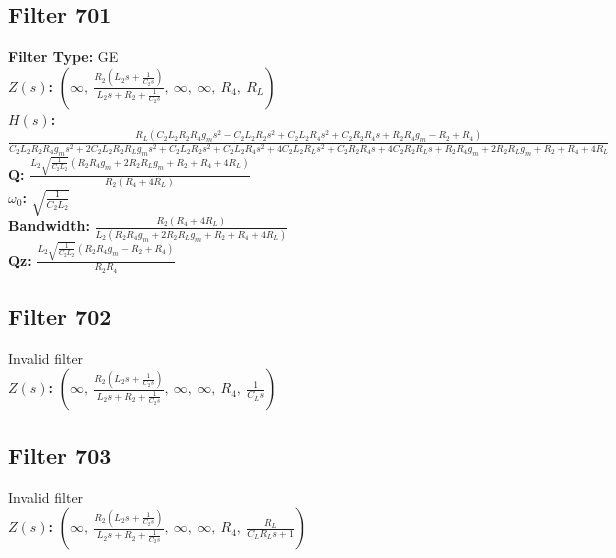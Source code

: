 \documentclass{article}
\begin{document}
\subsection*{Filter 701}
\textbf{Filter Type:} GE \\ 
\textbf{$Z(s)$:} $\left( \infty, \  \frac{R_{2} \left(L_{2} s + \frac{1}{C_{2} s}\right)}{L_{2} s + R_{2} + \frac{1}{C_{2} s}}, \  \infty, \  \infty, \  R_{4}, \  R_{L}\right)$ \\ 
\textbf{$H(s)$:} $\frac{R_{L} \left(C_{2} L_{2} R_{2} R_{4} g_{m} s^{2} - C_{2} L_{2} R_{2} s^{2} + C_{2} L_{2} R_{4} s^{2} + C_{2} R_{2} R_{4} s + R_{2} R_{4} g_{m} - R_{2} + R_{4}\right)}{C_{2} L_{2} R_{2} R_{4} g_{m} s^{2} + 2 C_{2} L_{2} R_{2} R_{L} g_{m} s^{2} + C_{2} L_{2} R_{2} s^{2} + C_{2} L_{2} R_{4} s^{2} + 4 C_{2} L_{2} R_{L} s^{2} + C_{2} R_{2} R_{4} s + 4 C_{2} R_{2} R_{L} s + R_{2} R_{4} g_{m} + 2 R_{2} R_{L} g_{m} + R_{2} + R_{4} + 4 R_{L}}$ \\ 
\textbf{Q:} $\frac{L_{2} \sqrt{\frac{1}{C_{2} L_{2}}} \left(R_{2} R_{4} g_{m} + 2 R_{2} R_{L} g_{m} + R_{2} + R_{4} + 4 R_{L}\right)}{R_{2} \left(R_{4} + 4 R_{L}\right)}$ \\ 
\textbf{$\omega_0$:} $\sqrt{\frac{1}{C_{2} L_{2}}}$ \\ 
\textbf{Bandwidth:} $\frac{R_{2} \left(R_{4} + 4 R_{L}\right)}{L_{2} \left(R_{2} R_{4} g_{m} + 2 R_{2} R_{L} g_{m} + R_{2} + R_{4} + 4 R_{L}\right)}$ \\ 
\textbf{Qz:} $\frac{L_{2} \sqrt{\frac{1}{C_{2} L_{2}}} \left(R_{2} R_{4} g_{m} - R_{2} + R_{4}\right)}{R_{2} R_{4}}$ \\ 
\subsection*{Filter 702}
Invalid filter \\ 
\textbf{$Z(s)$:} $\left( \infty, \  \frac{R_{2} \left(L_{2} s + \frac{1}{C_{2} s}\right)}{L_{2} s + R_{2} + \frac{1}{C_{2} s}}, \  \infty, \  \infty, \  R_{4}, \  \frac{1}{C_{L} s}\right)$ \\ 
\subsection*{Filter 703}
Invalid filter \\ 
\textbf{$Z(s)$:} $\left( \infty, \  \frac{R_{2} \left(L_{2} s + \frac{1}{C_{2} s}\right)}{L_{2} s + R_{2} + \frac{1}{C_{2} s}}, \  \infty, \  \infty, \  R_{4}, \  \frac{R_{L}}{C_{L} R_{L} s + 1}\right)$ \\ 
\end{document}
